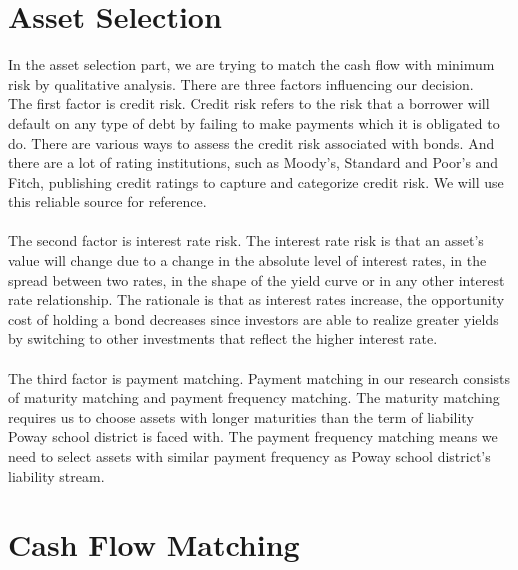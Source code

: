 \documentclass[oneside,12pt]{report}
\begin{document}
{\section{Asset Selection}
In the asset selection part, we are trying to match the cash flow with minimum risk by qualitative analysis. There are three factors influencing our decision.\\

\noindent The first factor is credit risk. Credit risk refers to the risk that a borrower will default on any type of debt by failing to make payments which it is obligated to do. There are various ways to assess the credit risk associated with bonds. And there are a lot of rating institutions, such as Moody's, Standard and Poor's and Fitch, publishing credit ratings to capture and categorize credit risk. We will use this reliable source for reference.
\\
\\
The second factor is interest rate risk. The interest rate risk is that an asset's value will change due to a change in the absolute level of interest rates, in the spread between two rates, in the shape of the yield curve or in any other interest rate relationship. The rationale is that as interest rates increase, the opportunity cost of holding a bond decreases since investors are able to realize greater yields by switching to other investments that reflect the higher interest rate.\\
\\
The third factor is payment matching. Payment matching in our research consists of maturity matching and payment frequency matching. The maturity matching requires us to choose assets with longer maturities than the term of liability Poway school district is faced with. The payment frequency matching means we need to select assets with similar payment frequency as Poway school district's liability stream.\\

\section{Cash Flow Matching}

}
\end{document}
